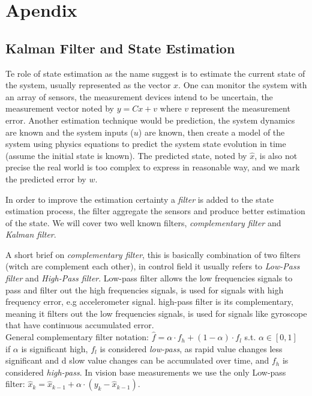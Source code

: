 \documentclass[ twoside, 12pt ]{article}
\begin{document}
\section{Apendix}
\subsection{Kalman Filter and State Estimation}
\label{sec:kalman}
Te role of state estimation as the name suggest is to estimate the current state of the system, usually represented as the vector $x$.
One can monitor the system with an array of sensors, the measurement devices intend to be uncertain, the measurement vector noted by $y=Cx+v$ where $v$ represent the measurement error.
Another estimation technique would be prediction, the system dynamics are known and the system inputs ($u$) are known, then create a model of the system using physics equations to predict the system state evolution in time (assume the initial state is known).
The predicted state, noted by $\hat{x}$, is also not precise the real world is too complex to express in reasonable way, and we mark the predicted error by $w$.

In order to improve the estimation certainty a \textit{filter} is added to the state estimation process, the filter aggregate the sensors and produce better estimation of the state.
We will cover two well known filters, \textit{complementary filter} and \textit{Kalman filter}.

A short brief on \textit{complementary filter}, this is basically combination of two filters (witch are complement each other), in control field it usually refers to \textit{Low-Pass filter} and \textit{High-Pass filter}.
Low-pass filter allows the low frequencies signals to pass and filter out the high frequencies signals, is used for signals with high frequency error, e.g accelerometer signal.
high-pass filter is its complementary, meaning it filters out the low frequencies signals, is used for signals like gyroscope that have continuous accumulated error.
\\General complementary filter notation: $\hat{f} = \alpha \cdot f_h + (1-\alpha) \cdot f_l$ s.t. $\alpha \in [0,1]$
\\if $\alpha$ is significant high, $f_l$ is considered \textit{low-pass}, as rapid value changes less significant and d slow value changes can be accumulated over time, and $f_h$ is considered \textit{high-pass}.
In vision base measurements we use the only Low-pass filter:
$ \hat{x}_k = \hat{x}_{k-1} + \alpha \cdot (y_k - \hat{x}_{k-1}) $.
\end{document}
